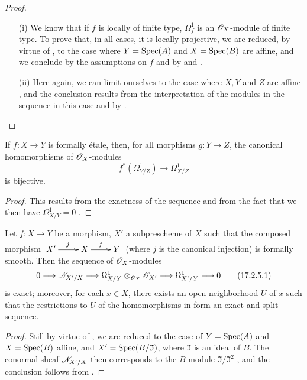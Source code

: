 \begin{proof}
\begin{enumerate}
\item[(i)] We know  that if $f$ is locally of finite type, $\Omega^1 _f$ is an $\mathscr{O}_X$-module of finite type. 
To prove that, in all cases, it is locally projective, we are reduced, by virtue of , to the case where $Y = {\mathop{\mathrm{Spec}}\nolimits}(A)$ and $X = {\mathop{\mathrm{Spec}}\nolimits}(B)$ are affine, and we conclude by the assumptions on $f$ and by  and .
\item[(ii)] Here again, we can limit ourselves to the case where $X, Y$ and $Z$ are affine , and the conclusion results from the interpretation of the modules in the sequence  in this case and by .
\end{enumerate}
\end{proof}

\begin{corollary}[17.2.4]
\label{IV.17.2.4}
If $f : X \to Y$ is formally \'etale, then, for all morphisms $g : Y \to Z$, the canonical homomorphisms of $\mathscr{O}_X$-modules
\[
  f^*(\Omega^1 _{Y/Z}) \to \Omega^1 _{X/Z}
\] is bijective.
\end{corollary}

\begin{proof}
This results from the exactness of the sequence  and from the fact that we then have $\Omega^1 _{X/Y} = 0$ .
\end{proof}

\begin{proposition}[17.2.5]
\label{IV.17.2.5}
Let $f: X \to Y$ be a morphism, $X'$ a subprescheme of $X$ such that the composed morphism $\xymatrix{X' \ar[r]^{j} & X \ar[r]^{f} & Y}$ (where $j$ is the canonical injection) is formally smooth. Then the sequence of $\mathscr{O}_X$-modules 
\[
\label{IV.17.2.5.1}
0 \to \sh{N}_{X'/X} \to \Omega^1 _{X/Y} \otimes_{\sh{O}_X} \sh{O}_{X'} \to \Omega^1 _{X'/Y} \to 0
\tag{17.2.5.1}
\] is exact; moreover, for each $x \in X$, there exists an open neighborhood $U$ of $x$ such that the restrictions to $U$ of the homomorphisms in  form an exact and split sequence.
\end{proposition}

\begin{proof}
Still by virtue of , we are reduced to the case of $Y = {\mathop{\mathrm{Spec}}\nolimits}(A)$ and $X = {\mathop{\mathrm{Spec}}\nolimits}(B)$ affine, and $X' = {\mathop{\mathrm{Spec}}\nolimits}(B/\mathfrak{I})$, where $\mathfrak{I}$ is an ideal of $B$. 
The conormal sheaf $\mathscr{N}_{X'/X}$ then corresponds to the $B$-module $\mathfrak{I}/\mathfrak{I}^2$ , and the conclusion follows from .
\end{proof}

